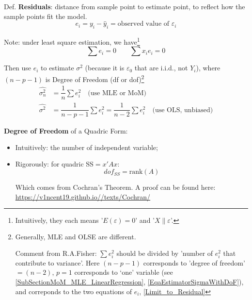     
    Def. \textbf{Residuals}: distance from sample point to estimate point, to reflect how the sample points fit the model.
    \begin{equation}
        e_i=y_i-\hat{y}_i=\text{observed value of }\varepsilon _i 
    \end{equation}
    
    Note: under least square estimation, we have\footnote{Intuitively, they each means '$ E(\varepsilon )=0 $' and '$ X\parallel \varepsilon  $'.}
\begin{equation}\label{Limit_to_Residual}
        \sum e_i=0\qquad \sum x_ie_i=0 
\end{equation}
    

    Then use $ e_i $ to estimate $ \sigma ^2 $ (because it is $ \varepsilon _0 $ that are i.i.d., not $ Y_i $), where $ (n-p-1) $ is Degree of Freedom (df or dof)\footnote{Generally, MLE and OLSE are different.

    Comment from R.A.Fisher: $ \sum e_i^2 $ should be divided by 'number of $ e_i^2 $ that contribute to variance'. Here $ (n-p-1) $ corresponds to 'degree of freedom' $ =(n-2) $, $ p=1 $ corresponds to `one' variable (see \autoref{SubSectionMoM_MLE_LinearRegression}, \autoref{EqaEstimatorSigmaWithDoF}), and correponds to the two equations of $ e_i $, \autoref{Limit_to_Residual}}
\begin{equation}\label{EqaOLSEstimatorOfSigma}
    \begin{aligned}
        \hat{\sigma _n^2}&=\dfrac{1}{n}\sum e_i^2 \quad\text{(use MLE or MoM)}\\
        \hat{\sigma^2}&=\dfrac{1}{n-p-1}\sum e_i^2=\dfrac{1}{n-2}\sum e_i^2\quad\text{(use OLS, unbiased)}
\end{aligned}
\end{equation}

\textbf{Degree of Freedom} of a Quadric Form:
\begin{itemize}[topsep=2pt,itemsep=2pt]
    \item Intuitively: the number of independent variable;
    \item Rigorously: for quadric $ \mathrm{SS}=x'Ax $:
    \begin{equation}\label{EqaDefinitionOfDegreeOfFreedom}
        dof_{SS}=\mathrm{rank}(A)
    \end{equation}

    Which comes from Cochran's Theorem. A proof can be found here: \url{https://v1ncent19.github.io//texts/Cochran/}
    
    
    
\end{itemize}


